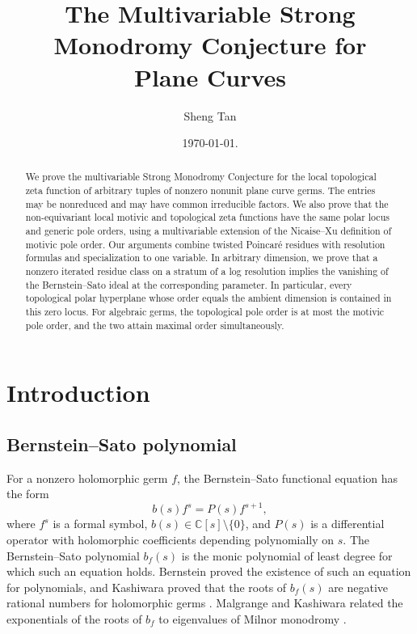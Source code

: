 \documentclass[12pt]{amsart}
\title[The Multivariable Strong Monodromy Conjecture for Plane Curves]{The Multivariable Strong Monodromy Conjecture for \\ Plane Curves}
\author{Sheng Tan}
\date{\today. }
\numberwithin{equation}{section}
\theoremstyle{plain}
\theoremstyle{definition}
\theoremstyle{remark}
\theoremstyle{definition}
\newcommand{\C}{\mathbb C}
\begin{document}
\begin{abstract}
We prove the multivariable Strong Monodromy Conjecture for the local topological zeta function of arbitrary tuples of nonzero nonunit plane curve germs. The entries may be nonreduced and may have common irreducible factors. We also prove that the non-equivariant local motivic and topological zeta functions have the same polar locus and generic pole orders, using a multivariable extension of the Nicaise--Xu definition of motivic pole order. Our arguments combine twisted Poincar\'e residues with resolution formulas and specialization to one variable. In arbitrary dimension, we prove that a nonzero iterated residue class on a stratum of a log resolution implies the vanishing of the Bernstein--Sato ideal at the corresponding parameter. In particular, every topological polar hyperplane whose order equals the ambient dimension is contained in this zero locus. For algebraic germs, the topological pole order is at most the motivic pole order, and the two attain maximal order simultaneously. 
\end{abstract}


\maketitle

\enlargethispage{2pt}
\tableofcontents


\section{Introduction}\label{sec:introduction}


\makeatletter
\let\introduction@tocwrite\@tocwrite
\def\@tocwrite#1#2{}
\makeatother

\subsection{Bernstein--Sato polynomial}

For a nonzero holomorphic germ $f$, the Bernstein--Sato functional equation has the form
\[
b(s)f^s=P(s)f^{s+1},
\]
where $f^s$ is a formal symbol, $b(s)\in\C[s]\setminus\{0\}$, and $P(s)$ is a differential operator with holomorphic coefficients depending polynomially on $s$. The Bernstein--Sato polynomial $b_f(s)$ is the monic polynomial of least degree for which such an equation holds. Bernstein proved the existence of such an equation for polynomials, and Kashiwara proved that the roots of $b_f(s)$ are negative rational numbers for holomorphic germs \cite{Bernstein1972,Kashiwara1976}. Malgrange and Kashiwara related the exponentials of the roots of $b_f$ to eigenvalues of Milnor monodromy \cite{Malgrange1975,Kashiwara1976}.
\end{document}
